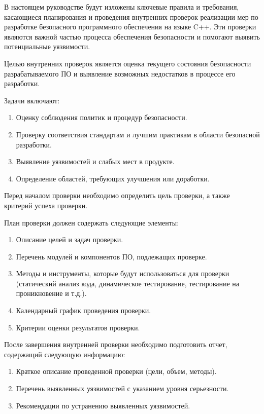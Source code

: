 В настоящем руководстве будут изложены ключевые правила и требования, касающиеся планирования и проведения внутренних проверок реализации мер по разработке безопасного программного обеспечения на языке C++. Эти проверки являются важной частью процесса обеспечения безопасности и помогают выявить потенциальные уязвимости.

Целью внутренних проверок является оценка текущего состояния безопасности разрабатываемого ПО и выявление возможных недостатков в процессе его разработки.

Задачи включают:
\begin{enumerate}
    \item Оценку соблюдения политик и процедур безопасности.
    \item Проверку соответствия стандартам и лучшим практикам в области безопасной разработки.
    \item Выявление уязвимостей и слабых мест в продукте.
    \item Определение областей, требующих улучшения или доработки.
\end{enumerate}

Перед началом проверки необходимо определить цель проверки, а также критерий успеха проверки.

План проверки должен содержать следующие элементы:
\begin{enumerate}
    \item Описание целей и задач проверки.
    \item Перечень модулей и компонентов ПО, подлежащих проверке.
    \item Методы и инструменты, которые будут использоваться для проверки (статический анализ кода, динамическое тестирование, тестирование на проникновение и т.д.).
    \item Календарный график проведения проверки.
    \item Критерии оценки результатов проверки.
\end{enumerate}

После завершения внутренней проверки необходимо подготовить отчет, содержащий следующую информацию:
\begin{enumerate}
    \item Краткое описание проведенной проверки (цели, объем, методы).
    \item Перечень выявленных уязвимостей с указанием уровня серьезности.
    \item Рекомендации по устранению выявленных уязвимостей.
\end{enumerate}

